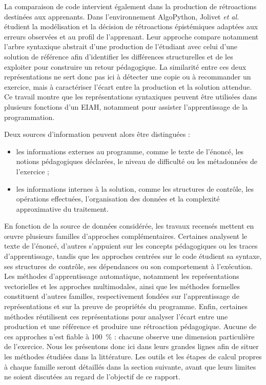 \documentclass[12pt,a4paper,oneside]{report}
\begin{document}
La comparaison de code intervient également dans la production de
rétroactions destinées aux apprenants. Dans l'environnement AlgoPython,
Jolivet \emph{et al.} \cite{jolivet_modelisation_2025} étudient la
modélisation et la décision de rétroactions épistémiques adaptées aux erreurs
observées et au profil de l'apprenant. Leur approche compare notamment l'arbre
syntaxique abstrait d'une production de l'étudiant avec celui d'une solution
de référence afin d'identifier les différences structurelles et de les
exploiter pour construire un retour pédagogique. La similarité entre ces
deux représentations ne sert donc pas ici à détecter une copie ou à
recommander un exercice, mais à caractériser l'écart entre la production et
la solution attendue. Ce travail montre que les représentations syntaxiques
peuvent être utilisées dans plusieurs fonctions d'un EIAH, notamment pour
assister l'apprentissage de la programmation.

Deux sources d'information peuvent alors être distinguées :

\begin{itemize}
    \item les informations externes au programme, comme le texte de
    l'énoncé, les notions pédagogiques déclarées, le niveau de difficulté ou
    les métadonnées de l'exercice ;
    \item les informations internes à la solution, comme les structures de
    contrôle, les opérations effectuées, l'organisation des données et la
    complexité approximative du traitement.
\end{itemize}

\vspace{12pt}


En fonction de la source de données considérée, les travaux recensés mettent
en œuvre plusieurs familles d'approches complémentaires. Certaines analysent
le texte de l'énoncé, d'autres s'appuient sur les concepts pédagogiques ou
les traces d'apprentissage, tandis que les approches centrées sur le code
étudient sa syntaxe, ses structures de contrôle, ses dépendances ou son
comportement à l'exécution. Les méthodes d'apprentissage automatique,
notamment les représentations vectorielles et les approches multimodales,
ainsi que les méthodes formelles constituent d'autres familles,
respectivement fondées sur l'apprentissage de représentations et sur la
preuve de propriétés du programme. Enfin, certaines méthodes réutilisent
ces représentations pour analyser l'écart entre une production et une
référence et produire une rétroaction pédagogique. Aucune de ces approches
n'est fiable à 100~\% : chacune observe une
dimension particulière de l'exercice. Nous les présentons donc ici dans
leurs grandes lignes afin de situer les méthodes étudiées dans la littérature.
Les outils et les étapes de calcul propres à chaque famille seront détaillés
dans la section suivante, avant que leurs limites ne soient discutées au
regard de l'objectif de ce rapport.
\end{document}
